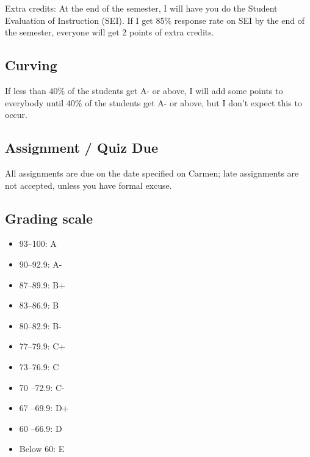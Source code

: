 \documentclass[12pt]{article}
\begin{document}
Extra credits: At the end of the semester, I will have you do the Student Evaluation of Instruction (SEI). If I get $85\%$ response rate on SEI by the end of the semester, everyone will get 2 points of extra credits.


\subsection*{Curving}

If less than $40\%$ of the students get A- or above, I will add some points to everybody until $40\%$ of the students get A- or above, but I don’t expect this to occur.

\subsection*{Assignment / Quiz Due}

All assignments are due on the date specified on Carmen; late assignments are not accepted, unless you have formal excuse.

\subsection*{Grading scale}
\begin{itemize}
    \item 93–100: A
    \item 90–92.9: A-
    \item 87–89.9: B+
    \item 83–86.9: B
    \item 80–82.9: B-
    \item 77–79.9: C+
    \item 73–76.9: C
    \item 70 –72.9: C-
    \item 67 –69.9: D+
    \item 60 –66.9: D
    \item Below 60: E
\end{itemize}









\printbibliography
\end{document}
